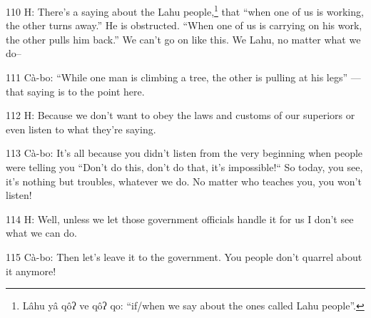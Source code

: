 110 H: There's a saying about the Lahu people,\footnote{Lâhu yâ qôʔ ve qôʔ qo: ``if/when we say about the ones called Lahu people''.} that ``when one of us
is working, the other turns away.'' He is obstructed. ``When one of us is carrying
on his work, the other pulls him back.'' We can't go on like this. We Lahu, no
matter what we do--

111 Cà-bo: ``While one man is climbing a tree, the other is pulling at his legs''
--- that saying is to the point here.

112 H: Because we don't want to obey the laws and customs of our superiors or even
listen to what they're saying.

113 Cà-bo: It's all because you didn't listen from the very beginning when people
were telling you ``Don't do this, don't do that, it's impossible!``
So today, you see, it's nothing but troubles, whatever we do. No matter who teaches
you, you won't listen!

114 H: Well, unless we let those government officials handle it for us I don't
see what we can do.

115 Cà-bo: Then let's leave it to the government. You people don't quarrel about
it anymore!

